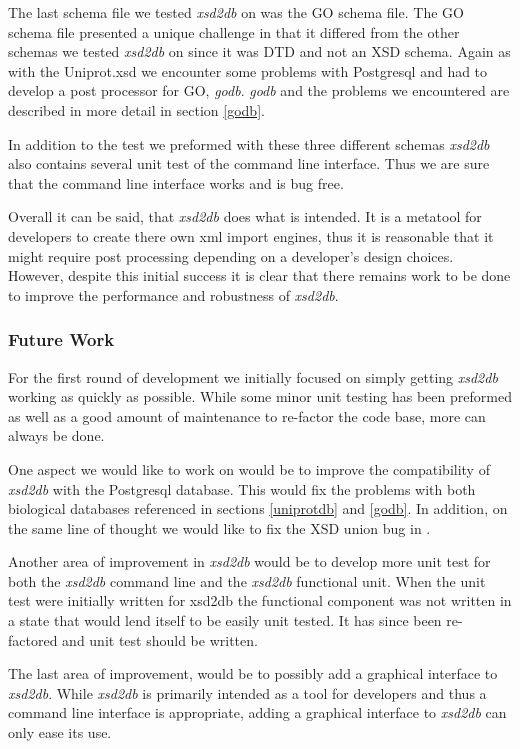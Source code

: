 The last schema file we tested \emph{xsd2db} on was the GO schema file.  The GO schema file presented a unique challenge in that it differed from the other schemas we tested \emph{xsd2db} on since it was DTD and not an XSD schema.  Again as with the Uniprot.xsd we encounter some problems with Postgresql and had to develop a post processor for GO, \emph{godb}.  \emph{godb} and the problems we encountered are described in more detail in section \ref{godb}.

In addition to the test we preformed with these three different schemas \emph{xsd2db} also contains several unit test of the command line interface.  Thus we are sure that the command line interface works and is bug free.

Overall it can be said, that \emph{xsd2db} does what is intended.  It is a metatool for developers to create there own xml import engines, thus it is reasonable that it might require post processing depending on a developer's design choices.  However, despite this initial success it is clear that there remains work to be done to improve the performance and robustness of \emph{xsd2db}. 

\subsubsection{Future Work}
For the first round of development we initially focused on simply getting \emph{xsd2db} working as quickly as possible.  While some minor unit testing has been preformed as well as a good amount of maintenance to re-factor the code base, more can always be done.  

One aspect we would like to work on would be to improve the compatibility of \emph{xsd2db} with the Postgresql database.  This would fix  the problems with both biological databases referenced in sections \ref{uniprotdb} and \ref{godb}.  In addition, on the same line of thought we would like to fix the XSD union bug in .

Another area of improvement in \emph{xsd2db} would be to develop more unit test for both the \emph{xsd2db} command line and the \emph{xsd2db} functional unit.  When the unit test were initially written for xsd2db the functional component was not written in a state that would lend itself to be easily unit tested.  It has since been re-factored and unit test should be written.

The last area of improvement, would be to possibly add a graphical interface to \emph{xsd2db}.  While \emph{xsd2db} is primarily intended as a tool for developers and thus a command line interface is appropriate, adding a graphical interface to \emph{xsd2db} can only ease its use.



